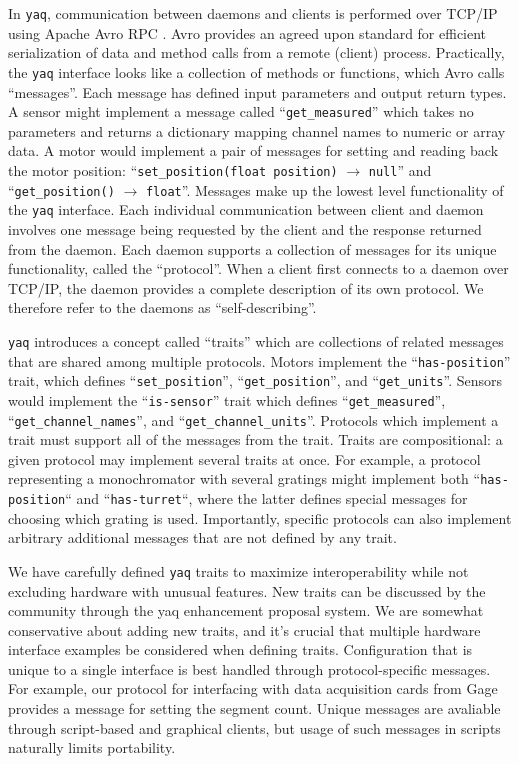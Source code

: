 \documentclass[aip, amsmath, amssymb, reprint,]{revtex4-2}
\newcommand\yaq{\texttt{yaq}}
\begin{document}
In \yaq{}, communication between daemons and clients is performed over TCP/IP using Apache Avro RPC \cite{AvroSpecification}.
Avro provides an agreed upon standard for efficient serialization of data and method calls from a remote (client) process.
Practically, the \yaq{} interface looks like a collection of methods or functions, which Avro calls ``messages''.
Each message has defined input parameters and output return types.
A sensor might implement a message called ``\texttt{get\_measured}'' which takes no parameters and returns a dictionary mapping channel names to numeric or array data.
A motor would implement a pair of messages for setting and reading back the motor position: ``\texttt{set\_position(float position)} $\rightarrow$ \texttt{null}'' and ``\texttt{get\_position()} $\rightarrow$ \texttt{float}''.
Messages make up the lowest level functionality of the \yaq{} interface.
Each individual communication between client and daemon involves one message being requested by the client and the response returned from the daemon.
Each daemon supports a collection of messages for its unique functionality, called the ``protocol''.
When a client first connects to a daemon over TCP/IP, the daemon provides a complete description of its own protocol.
We therefore refer to the daemons as ``self-describing''.

\yaq{} introduces a concept called ``traits'' which are collections of related messages that are shared among multiple protocols.
Motors implement the ``\texttt{has-position}'' trait, which defines ``\texttt{set\_position}'', ``\texttt{get\_position}'', and ``\texttt{get\_units}''.
Sensors would implement the ``\texttt{is-sensor}'' trait which defines ``\texttt{get\_measured}'', ``\texttt{get\_channel\_names}'', and ``\texttt{get\_channel\_units}''.
Protocols which implement a trait must support all of the messages from the trait.
Traits are compositional: a given protocol may implement several traits at once.
For example, a protocol representing a monochromator with several gratings might implement both ``\texttt{has-position}`` and ``\texttt{has-turret}``, where the latter defines special messages for choosing which grating is used.
Importantly, specific protocols can also implement arbitrary additional messages that are not defined by any trait.

We have carefully defined \yaq{} traits to maximize interoperability while not excluding hardware with unusual features.
New traits can be discussed by the community through the yaq enhancement proposal system.
We are somewhat conservative about adding new traits, and it's crucial that multiple hardware interface examples be considered when defining traits.
Configuration that is unique to a single interface is best handled through protocol-specific messages.
For example, our protocol for interfacing with data acquisition cards from Gage provides a message for setting the segment count.
Unique messages are avaliable through script-based and graphical clients, but usage of such messages in scripts naturally limits portability.
\end{document}
